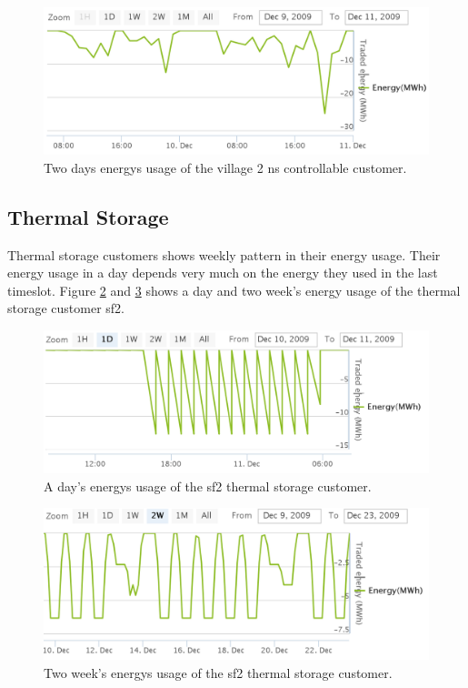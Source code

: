 \begin{figure}[h!]
  \includegraphics[width=\linewidth]{village2nsControllable.png}
  \caption{Two days energys usage of the village 2 ns controllable customer.}
  \label{fig:2weekOffice}
\end{figure}

\subsection{Thermal Storage}
Thermal storage customers shows weekly pattern in their energy usage. Their energy usage in a day depends very much on the energy they used in the last timeslot. Figure \ref{fig:day-thermal} and \ref{fig:thermal-week} shows a day and two week's energy usage of the thermal storage customer sf2.

\begin{figure}[h!]
  \includegraphics[width=\linewidth]{sf2-thermal-daily.png}
  \caption{A day's energys usage of the sf2 thermal storage customer.}
  \label{fig:day-thermal}
\end{figure}

\begin{figure}[h!]
  \includegraphics[width=\linewidth]{sf2-thermal-week.png}
  \caption{Two week's energys usage of the sf2 thermal storage customer.}
  \label{fig:thermal-week}
\end{figure}


